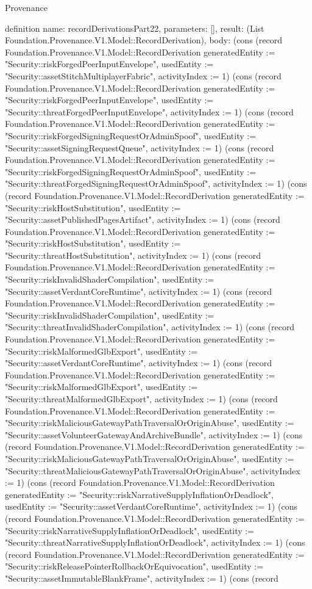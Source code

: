 \begin{lexlean}{Provenance}
\begin{semanticmodule}
definition{
  name: recordDerivationsPart22,
  parameters: [],
  result: (List Foundation.Provenance.V1.Model::RecordDerivation),
  body: (cons (record Foundation.Provenance.V1.Model::RecordDerivation {generatedEntity := "Security::riskForgedPeerInputEnvelope", usedEntity := "Security::assetStitchMultiplayerFabric", activityIndex := 1}) (cons (record Foundation.Provenance.V1.Model::RecordDerivation {generatedEntity := "Security::riskForgedPeerInputEnvelope", usedEntity := "Security::threatForgedPeerInputEnvelope", activityIndex := 1}) (cons (record Foundation.Provenance.V1.Model::RecordDerivation {generatedEntity := "Security::riskForgedSigningRequestOrAdminSpoof", usedEntity := "Security::assetSigningRequestQueue", activityIndex := 1}) (cons (record Foundation.Provenance.V1.Model::RecordDerivation {generatedEntity := "Security::riskForgedSigningRequestOrAdminSpoof", usedEntity := "Security::threatForgedSigningRequestOrAdminSpoof", activityIndex := 1}) (cons (record Foundation.Provenance.V1.Model::RecordDerivation {generatedEntity := "Security::riskHostSubstitution", usedEntity := "Security::assetPublishedPagesArtifact", activityIndex := 1}) (cons (record Foundation.Provenance.V1.Model::RecordDerivation {generatedEntity := "Security::riskHostSubstitution", usedEntity := "Security::threatHostSubstitution", activityIndex := 1}) (cons (record Foundation.Provenance.V1.Model::RecordDerivation {generatedEntity := "Security::riskInvalidShaderCompilation", usedEntity := "Security::assetVerdantCoreRuntime", activityIndex := 1}) (cons (record Foundation.Provenance.V1.Model::RecordDerivation {generatedEntity := "Security::riskInvalidShaderCompilation", usedEntity := "Security::threatInvalidShaderCompilation", activityIndex := 1}) (cons (record Foundation.Provenance.V1.Model::RecordDerivation {generatedEntity := "Security::riskMalformedGlbExport", usedEntity := "Security::assetVerdantCoreRuntime", activityIndex := 1}) (cons (record Foundation.Provenance.V1.Model::RecordDerivation {generatedEntity := "Security::riskMalformedGlbExport", usedEntity := "Security::threatMalformedGlbExport", activityIndex := 1}) (cons (record Foundation.Provenance.V1.Model::RecordDerivation {generatedEntity := "Security::riskMaliciousGatewayPathTraversalOrOriginAbuse", usedEntity := "Security::assetVolunteerGatewayAndArchiveBundle", activityIndex := 1}) (cons (record Foundation.Provenance.V1.Model::RecordDerivation {generatedEntity := "Security::riskMaliciousGatewayPathTraversalOrOriginAbuse", usedEntity := "Security::threatMaliciousGatewayPathTraversalOrOriginAbuse", activityIndex := 1}) (cons (record Foundation.Provenance.V1.Model::RecordDerivation {generatedEntity := "Security::riskNarrativeSupplyInflationOrDeadlock", usedEntity := "Security::assetVerdantCoreRuntime", activityIndex := 1}) (cons (record Foundation.Provenance.V1.Model::RecordDerivation {generatedEntity := "Security::riskNarrativeSupplyInflationOrDeadlock", usedEntity := "Security::threatNarrativeSupplyInflationOrDeadlock", activityIndex := 1}) (cons (record Foundation.Provenance.V1.Model::RecordDerivation {generatedEntity := "Security::riskReleasePointerRollbackOrEquivocation", usedEntity := "Security::assetImmutableBlankFrame", activityIndex := 1}) (cons (record }
\end{semanticmodule}
\end{lexlean}
